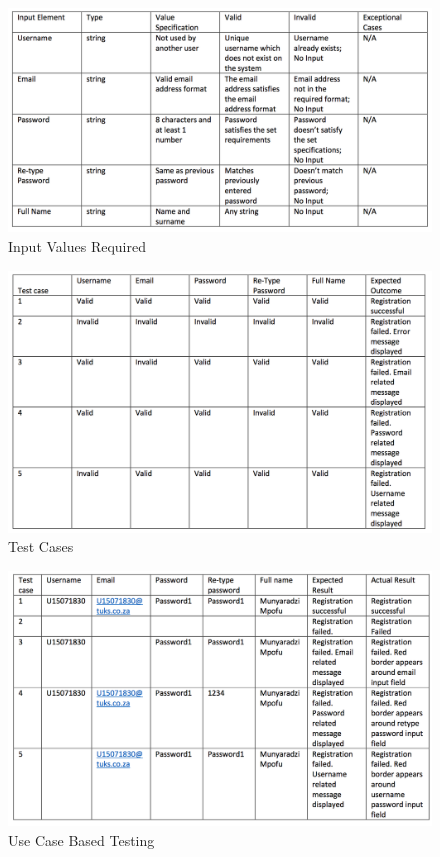 \documentclass[english]{article}
\begin{document}
\begin{figure}[H]
\centering
\includegraphics[width=1.0\textwidth]{Input_Values_Required}
\caption{Input Values Required}
\end{figure}
\begin{figure}[H]
\centering
\includegraphics[width=1.0\textwidth]{Test_Cases}
\caption{Test Cases}
\end{figure}
\begin{figure}[H]
\centering
\includegraphics[width=1.0\textwidth]{Use_Case_Based_Testing}
\caption{Use Case Based Testing}
\end{figure}
\end{document}
